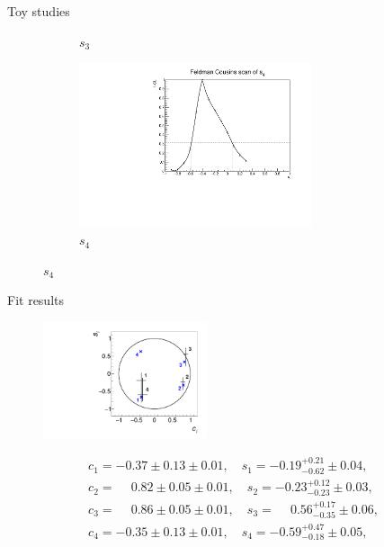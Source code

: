 \documentclass{beamer}
\begin{document}
\begin{frame}{Toy studies}
\begin{figure}
\begin{subfigure}{0.5\textwidth}
      \caption{$s_3$}
    \end{subfigure}%
    \begin{subfigure}{0.5\textwidth}
      \centering
      \includegraphics[width=0.75\textwidth]{Plots/Feldman_Cousins_CL_s4.pdf}
      \caption{$s_4$}
    \end{subfigure}
  \end{figure}
\end{frame}

\begin{frame}{Fit results}
  \begin{figure}
    \includegraphics[width=0.43\textwidth]{Plots/cisi_FitResults_Model.pdf}
  \end{figure}
  \vspace{-0.2cm}
  \begin{align*}
    c_1 = -0.37 \pm 0.13 \pm 0.01, \quad s_1 = -0.19_{-0.62}^{+0.21} \pm 0.04, \\
    c_2 = \phantom{-}0.82 \pm 0.05 \pm 0.01, \quad s_2 = -0.23_{-0.23}^{+0.12} \pm 0.03, \\
    c_3 = \phantom{-}0.86 \pm 0.05 \pm 0.01, \quad s_3 = \phantom{-}0.56_{-0.35}^{+0.17} \pm 0.06, \\
    c_4 = -0.35 \pm 0.13 \pm 0.01, \quad s_4 = -0.59_{-0.18}^{+0.47} \pm 0.05, \\
  \end{align*}
\end{frame}
\end{document}
